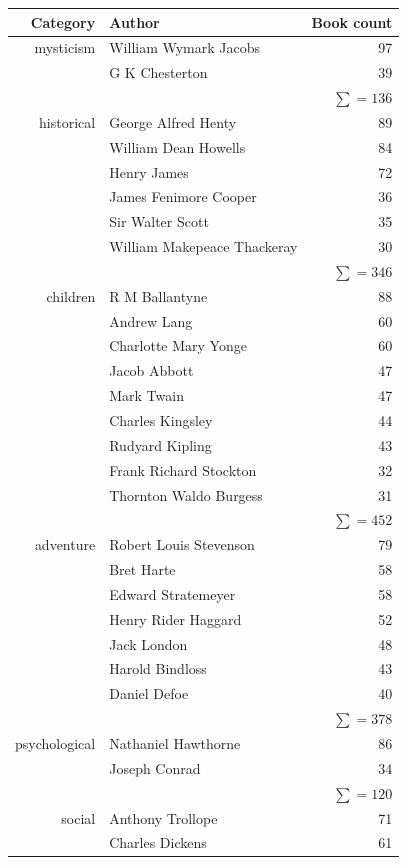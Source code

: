 \documentclass[fleqn]{article}
\begin{document}
	\begin{table}[ht]
		\centering
		\begin{tabular}{r|l|r}
			Category & Author & Book count\\
			\hline
			\hline
			mysticism & William Wymark Jacobs & 97 \\
			& G K Chesterton & 39 \\
			& & $\sum = 136$ \\
			\hline
			historical & George Alfred Henty & 89 \\
			& William Dean Howells & 84 \\
			& Henry James & 72 \\
			& James Fenimore Cooper & 36 \\
			& Sir Walter Scott & 35 \\
			& William Makepeace Thackeray & 30 \\
			& & $\sum = 346$ \\
			\hline
			children & R M Ballantyne & 88 \\
			& Andrew Lang & 60 \\
			& Charlotte Mary Yonge & 60 \\
			& Jacob Abbott & 47 \\
			& Mark Twain & 47 \\
			& Charles Kingsley & 44 \\
			& Rudyard Kipling & 43 \\
			& Frank Richard Stockton & 32 \\
			& Thornton Waldo Burgess & 31 \\
			& & $\sum = 452$ \\
			\hline
			adventure & Robert Louis Stevenson & 79 \\
			& Bret Harte & 58 \\
			& Edward Stratemeyer & 58 \\
			& Henry Rider Haggard & 52 \\
			& Jack London & 48 \\
			& Harold Bindloss & 43 \\
			& Daniel Defoe & 40 \\
			& & $\sum = 378$ \\
			\hline
			psychological & Nathaniel Hawthorne & 86 \\
			& Joseph Conrad & 34 \\
			& & $\sum = 120$ \\
			\hline
			social & Anthony Trollope & 71 \\
			& Charles Dickens & 61 \\

\end{tabular}
\end{table}
\end{document}
